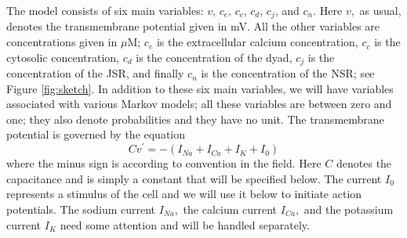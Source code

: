 The model consists of six main variables: $v, \, c_{e}, \, c_{c}, \, c_{d}, \, c_{j}$, and $c_{n}.$
Here $v,$ as usual, denotes the transmembrane potential given in mV. All the
other variables are concentrations given in $\mu$M; $c_{e}$ is the extracellular calcium concentration, $c_{c}$ is the cytosolic
concentration, $c_{d}$ is the concentration of the dyad, $c_{j}$ is the
concentration of the JSR, and finally $c_{n}$ is the concentration of the NSR;
see Figure \ref{fig:sketch}. In addition to these six main variables, we will have
variables associated with various Markov models; all these variables are between zero
and one; they also denote probabilities and they have no unit. The transmembrane
potential is governed by the equation
\begin{equation}
Cv^{\prime}=-\left(  I_{Na}+I_{Ca}+I_{K}+I_{0}\right)  \label{dvdt50}
\end{equation}
where the minus sign is according to convention in the field. Here $C$ denotes the
capacitance and is simply a constant that will be specified below. The current
$I_{0}$ represents a stimulus of the cell and we will use it below to initiate
action potentials. The sodium current $I_{Na},$ the calcium current $I_{Ca},$
and the potassium current $I_{K}$ need some attention and will be handled
separately.

